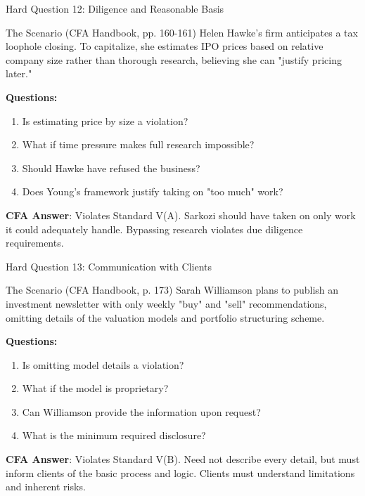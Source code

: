 \documentclass{beamer}
\begin{document}
	\begin{frame}{Hard Question 12: Diligence and Reasonable Basis}
		\begin{block}{The Scenario (CFA Handbook, pp. 160-161)}
			Helen Hawke's firm anticipates a tax loophole closing. To capitalize, she estimates IPO prices based on relative company size rather than thorough research, believing she can "justify pricing later."
		\end{block}
		
		\vspace{0.2cm}
		\textbf{Questions:}
		\begin{enumerate}
			\item Is estimating price by size a violation?
			\item What if time pressure makes full research impossible?
			\item Should Hawke have refused the business?
			\item Does Young's framework justify taking on "too much" work?
		\end{enumerate}
		
		\vspace{0.2cm}
		\textcolor{cfablue}{\textbf{CFA Answer}}: Violates Standard V(A). Sarkozi should have taken on only work it could adequately handle. Bypassing research violates due diligence requirements.
	\end{frame}
	
	\begin{frame}{Hard Question 13: Communication with Clients}
		\begin{block}{The Scenario (CFA Handbook, p. 173)}
			Sarah Williamson plans to publish an investment newsletter with only weekly "buy" and "sell" recommendations, omitting details of the valuation models and portfolio structuring scheme.
		\end{block}
		
		\vspace{0.2cm}
		\textbf{Questions:}
		\begin{enumerate}
			\item Is omitting model details a violation?
			\item What if the model is proprietary?
			\item Can Williamson provide the information upon request?
			\item What is the minimum required disclosure?
		\end{enumerate}
		
		\vspace{0.2cm}
		\textcolor{cfablue}{\textbf{CFA Answer}}: Violates Standard V(B). Need not describe every detail, but must inform clients of the basic process and logic. Clients must understand limitations and inherent risks.
	\end{frame}
	
\end{document}
